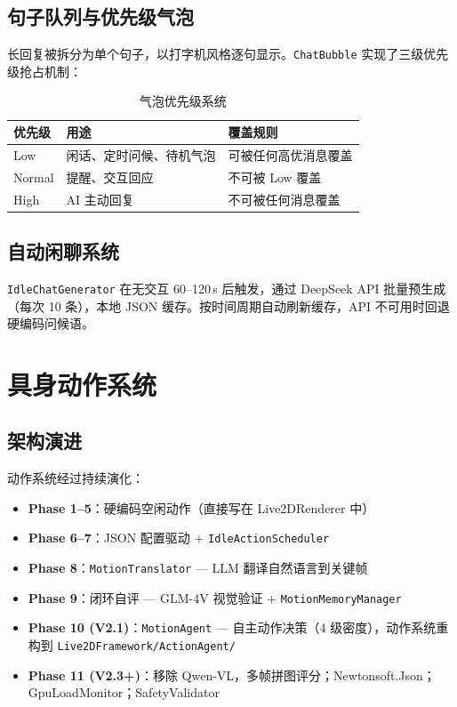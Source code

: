 \documentclass[12pt,a4paper]{ctexart}
\begin{document}
\subsection{句子队列与优先级气泡}

长回复被拆分为单个句子，以打字机风格逐句显示。\texttt{ChatBubble} 实现了三级优先级抢占机制：

\begin{table}[H]
\centering
\caption{气泡优先级系统}
\label{tab:priority}
\begin{tabular}{lll}
\toprule
\textbf{优先级} & \textbf{用途} & \textbf{覆盖规则} \\
\midrule
Low & 闲话、定时问候、待机气泡 & 可被任何高优消息覆盖 \\
Normal & 提醒、交互回应 & 不可被 Low 覆盖 \\
High & AI 主动回复 & 不可被任何消息覆盖 \\
\bottomrule
\end{tabular}
\end{table}

\subsection{自动闲聊系统}

\texttt{IdleChatGenerator} 在无交互 60--120\,s 后触发，通过 DeepSeek API 批量预生成
（每次 10 条），本地 JSON 缓存。按时间周期自动刷新缓存，API 不可用时回退硬编码问候语。

\section{具身动作系统}

\subsection{架构演进}

动作系统经过持续演化：

\begin{itemize}
    \item \textbf{Phase 1--5}：硬编码空闲动作（直接写在 Live2DRenderer 中）
    \item \textbf{Phase 6--7}：JSON 配置驱动 + \texttt{IdleActionScheduler}
    \item \textbf{Phase 8}：\texttt{MotionTranslator} --- LLM 翻译自然语言到关键帧
    \item \textbf{Phase 9}：闭环自评 --- GLM-4V 视觉验证 + \texttt{MotionMemoryManager}
    \item \textbf{Phase 10 (V2.1)}：\texttt{MotionAgent} --- 自主动作决策（4 级密度），动作系统重构到 \texttt{Live2DFramework/ActionAgent/}
    \item \textbf{Phase 11 (V2.3+)}：移除 Qwen-VL，多帧拼图评分；Newtonsoft.Json；GpuLoadMonitor；SafetyValidator
\end{itemize}
\end{document}
